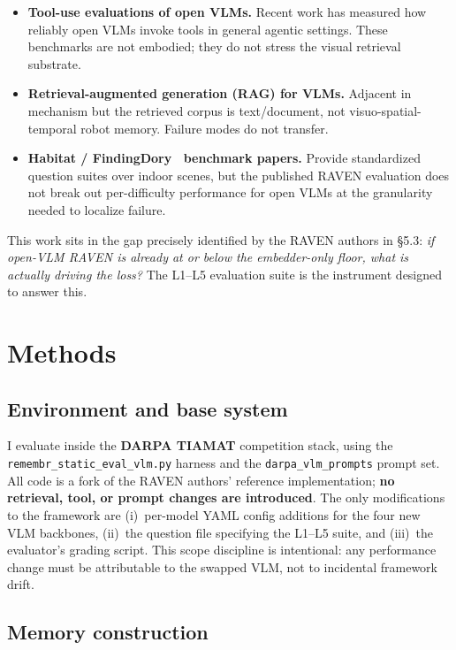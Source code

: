 \documentclass[12pt,letterpaper,oneside]{article}
\begin{document}
\begin{itemize}
  \item \textbf{Tool-use evaluations of open VLMs.}  Recent work has
    measured how reliably open VLMs invoke tools in general agentic
    settings.  These benchmarks are not embodied; they do not stress
    the visual retrieval substrate.
  \item \textbf{Retrieval-augmented generation (RAG) for VLMs.}
    Adjacent in mechanism but the retrieved corpus is text/document,
    not visuo-spatial-temporal robot memory.  Failure modes do not
    transfer.
  \item \textbf{Habitat / FindingDory~\cite{ref:findingdory} benchmark
    papers.}  Provide standardized question suites over indoor scenes,
    but the published RAVEN evaluation does not break out per-difficulty
    performance for open VLMs at the granularity needed to localize
    failure.
\end{itemize}

This work sits in the gap precisely identified by the RAVEN authors in
\S5.3: \emph{if open-VLM RAVEN is already at or below the
embedder-only floor, what is actually driving the loss?}  The L1--L5
evaluation suite is the instrument designed to answer this.

\section{Methods}\label{sec:methods}

\subsection{Environment and base system}

I evaluate inside the \textbf{DARPA TIAMAT} competition stack, using
the \texttt{remembr\_static\_eval\_vlm.py} harness and the
\texttt{darpa\_vlm\_prompts} prompt set.  All code is a fork of the
RAVEN authors' reference implementation; \textbf{no retrieval, tool,
or prompt changes are introduced}.  The only modifications to the
framework are (i)~per-model YAML config additions for the four new VLM
backbones, (ii)~the question file specifying the L1--L5 suite, and
(iii)~the evaluator's grading script.  This scope discipline is
intentional: any performance change must be attributable to the
swapped VLM, not to incidental framework drift.

\subsection{Memory construction}
\end{document}
